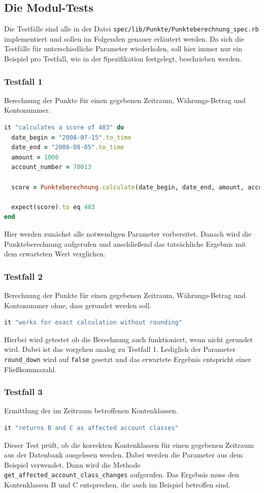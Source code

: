 \documentclass[12pt]{scrreprt}
\begin{document}
\subsection{Die Modul-Tests}

Die Testfälle sind alle in der Datei \verb+spec/lib/Punkte/Punkteberechnung_spec.rb+ implementiert und sollen im Folgenden genauer erläutert werden. Da sich die Testfälle für unterschiedliche Parameter wiederholen, soll hier immer nur ein Beispiel pro Testfall, wie in der Spezifikation festgelegt, beschrieben werden. \\

\subsubsection{Testfall 1}
Berechnung der Punkte für einen gegebenen Zeitraum, Währungs-Betrag und Kontonummer.
\begin{lstlisting}[language=Ruby]
it "calculates a score of 483" do
  date_begin = "2008-07-15".to_time
  date_end = "2008-08-05".to_time
  amount = 1000
  account_number = 70013

  score = Punkteberechnung.calculate(date_begin, date_end, amount, account_number)
  
  expect(score).to eq 483
end
\end{lstlisting}
Hier werden zunächst alle notwendigen Parameter vorbereitet. Danach wird die Punkteberechnung aufgerufen und anschließend das tatsächliche Ergebnis mit dem erwarteten Wert verglichen.

\subsubsection{Testfall 2}
Berechnung der Punkte für einen gegebenen Zeitraum, Währungs-Betrag und Kontonummer ohne, dass gerundet werden soll.
\begin{lstlisting}[language=Ruby]
it "works for exact calculation without rounding"
\end{lstlisting}
Hierbei wird getestet ob die Berechnung auch funktioniert, wenn nicht gerundet wird. Dabei ist das vorgehen analog zu Testfall 1. Lediglich der Parameter \verb+round_down+ wird auf \verb+false+ gesetzt und das erwartete Ergebnis entspricht einer Fließkommazahl.

\subsubsection{Testfall 3}
Ermittlung der im Zeitraum betroffenen Kontenklassen.
\begin{lstlisting}[language=Ruby]
it "returns B and C as affected account classes"
\end{lstlisting}
Dieser Test prüft, ob die korrekten Kontenklassen für einen gegebenen Zeitraum aus der Datenbank ausgelesen werden. Dabei werden die Parameter aus dem Beispiel verwendet. Dann wird die Methode \verb+get_affected_account_class_changes+ aufgerufen. Das Ergebnis muss den Kontenklassen B und C entsprechen, die auch im Beispiel betroffen sind.
\end{document}
